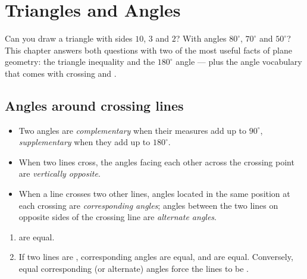 \chapter{Triangles and Angles}\label{ch:g7:triangles}

Can you draw a triangle with sides $10$, $3$ and $2$? With angles
$80^\circ$, $70^\circ$ and $50^\circ$? This chapter answers both
questions with two of the most useful facts of plane geometry: the
triangle inequality and the $180^\circ$ angle  --- plus the angle
vocabulary that comes with crossing and .

\section{Angles around crossing lines}

\begin{definition}\label{def:g7:triangles:pairs}
\begin{itemize}
  \item Two angles are \emph{complementary} when their measures add up
        to $90^\circ$, \emph{supplementary} when they add up to
        $180^\circ$.
  \item When two lines cross, the angles facing each other across the
        crossing point are \emph{vertically
        opposite}.
  \item When a line crosses two other lines, angles located in the
        same position at each crossing are
        \emph{corresponding angles}; angles between the two lines on
        opposite sides of the crossing line are \emph{alternate
        angles}.
\end{itemize}
\end{definition}

\begin{theorem}\label{thm:g7:triangles:equalities}
\begin{enumerate}
  \item {} are equal.
  \item If two lines are , corresponding angles are equal, and
         are equal. Conversely, equal corresponding
        (or alternate) angles force the lines to be .
\end{enumerate}
\end{theorem}

